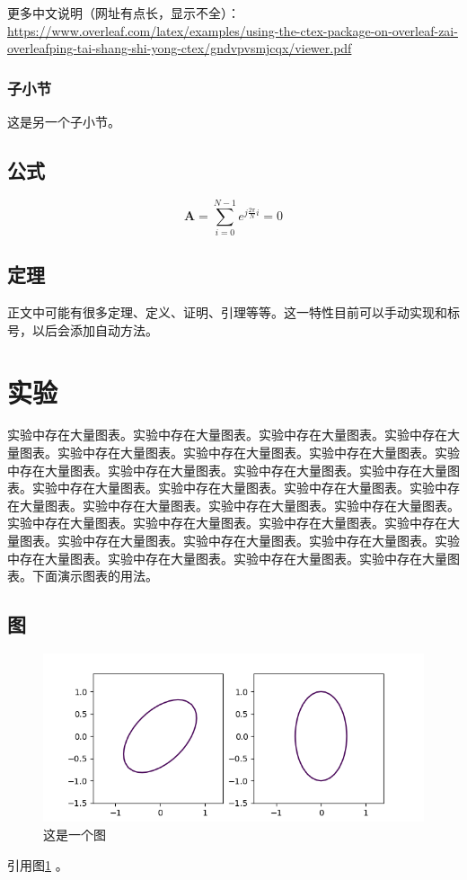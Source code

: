 \documentclass[12pt]{article} %
\begin{document}
更多中文说明（网址有点长，显示不全）：\\\url{https://www.overleaf.com/latex/examples/using-the-ctex-package-on-overleaf-zai-overleafping-tai-shang-shi-yong-ctex/gndvpvsmjcqx/viewer.pdf}

\subsubsection{子小节}
这是另一个子小节。

\subsection{公式}
\begin{equation}
\label{eqn:eqn1}
\mathbf{A}=\sum\limits_{i=0}^{N-1}{e^{j\frac{2\pi}{N}i}}=0
\end{equation}

\subsection{定理}
正文中可能有很多定理、定义、证明、引理等等。这一特性目前可以手动实现和标号，以后会添加自动方法。


\section{实验}
实验中存在大量图表。实验中存在大量图表。实验中存在大量图表。实验中存在大量图表。实验中存在大量图表。实验中存在大量图表。实验中存在大量图表。实验中存在大量图表。实验中存在大量图表。实验中存在大量图表。实验中存在大量图表。实验中存在大量图表。实验中存在大量图表。实验中存在大量图表。实验中存在大量图表。实验中存在大量图表。实验中存在大量图表。实验中存在大量图表。实验中存在大量图表。实验中存在大量图表。实验中存在大量图表。实验中存在大量图表。实验中存在大量图表。实验中存在大量图表。实验中存在大量图表。实验中存在大量图表。实验中存在大量图表。实验中存在大量图表。实验中存在大量图表。下面演示图表的用法。

\subsection{图}
\begin{figure}[ht]
\centering
\includegraphics[width=\textwidth]{canoform.png}
\caption{这是一个图}
\label{fig:fig1}
\end{figure}
引用图\ref{fig:fig1} 。
\end{document}
